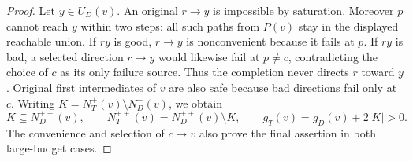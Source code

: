 \begin{proof}
Let $y\in U_D(v)$. An original $r\to y$ is impossible by saturation.
Moreover $p$ cannot reach $y$ within two steps: all such paths from
$P(v)$ stay in the displayed reachable union.
If $ry$ is good, $r\to y$ is nonconvenient because it fails at $p$.
If $ry$ is bad, a selected direction $r\to y$ would likewise fail at
$p\ne c$, contradicting the choice of $c$ as its only failure source.
Thus the completion never directs $r$ toward $y$.
Original first intermediates of $v$ are also safe because bad
directions fail only at $c$.
Writing $K=N_T^+(v)\setminus N_D^+(v)$, we obtain
\[
 K\subseteq N_D^{++}(v),\qquad
 N_T^{++}(v)=N_D^{++}(v)\setminus K,
 \qquad g_T(v)=g_D(v)+2|K|>0.
\]
The convenience and selection of $c\to v$ also prove the final
assertion in both large-budget cases.
\end{proof}

